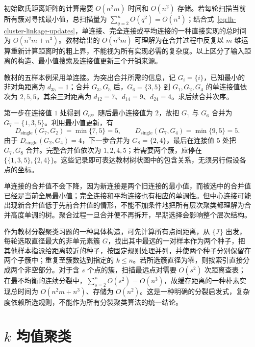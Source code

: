 初始欧氏距离矩阵的计算需要 $O(n^2m)$ 时间和 $O(n^2)$ 存储。若每轮扫描当前所有簇对寻找最小值，总扫描量为 $\sum_{q=2}^nO(q^2)=O(n^3)$；结合式~\eqref{eq:lh-cluster-linkage-updates}，单连接、完全连接或平均连接的一种直接实现的总时间为 $O(n^2m+n^3)$。教材给出的 $O(n^3m)$ 可理解为在合并过程中反复以 $m$ 维运算重新计算距离时的粗上界，不能视为所有实现必需的复杂度。以上区分了输入距离的构造、最小值搜索及连接值更新三个开销来源。

\begin{example}
\label{ex:lh-cluster-agglomerative-five}
教材的五样本例采用单连接。为突出合并所需的信息，记 $G_i=\{i\}$，已知最小的非对角距离为 $d_{35}=1$；合并 $G_3,G_5$ 后，$G_6=\{3,5\}$ 到 $G_1,G_2,G_4$ 的单连接值依次为 $2,5,5$，其余三对距离为 $d_{12}=7$、$d_{14}=9$、$d_{24}=4$。求后续合并次序。
\end{example}
\begin{solve}
第一步在连接值 $1$ 处得到 $G_6$。随后最小连接值为 $2$，故把 $G_1$ 与 $G_6$ 合并为 $G_7=\{1,3,5\}$。利用最小值更新，有
\[
D_{\mathrm{single}}(G_7,G_2)=\min\{7,5\}=5,\qquad
D_{\mathrm{single}}(G_7,G_4)=\min\{9,5\}=5.
\]
由于 $D_{\mathrm{single}}(G_2,G_4)=4$，下一步合并为 $G_8=\{2,4\}$，最后在连接值 $5$ 处把 $G_7,G_8$ 合并。完整合并值依次为 $1,2,4,5$；若需要两个簇，应停在 $\{\{1,3,5\},\{2,4\}\}$。这些记录即可表达教材树状图中的包含关系，无须另行假设各点的坐标。
\end{solve}

单连接的合并值不会下降，因为新连接是两个旧连接的最小值，而被选中的合并值已经是当前全局最小值；完全连接和平均连接也有相应的单调性。但中心连接可能出现新合并值低于先前合并值的情形，不能不加条件地把所有层次聚类都理解为合并高度单调的树。聚合过程一旦合并便不再拆开，早期选择会影响整个层次结构。

作为教材分裂聚类习题的一种具体构造，可先计算所有点间距离，从 $\{\mathcal I\}$ 出发，每轮选取直径最大的非单元素簇 $G$，找出其中最远的一对样本作为两个种子，把其他样本指派给距离较近的种子，按固定规则处理并列，并使两个种子分别保留在两个子簇中；重复至簇数达到指定的 $k\leq n$。若所选簇直径为零，则按索引直接分成两个非空部分。对于含 $s$ 个点的簇，扫描最远点对需要 $O(s^2)$ 次距离查表；在最不均衡的连续分裂中，$\sum_{s=2}^nO(s^2)=O(n^3)$，故缓存距离的一种朴素实现总时间为 $O(n^2m+n^3)$、存储为 $O(n^2)$。这是一种明确的分裂启发式，复杂度依赖所选规则，不能作为所有分裂聚类算法的统一结论。

\section{\texorpdfstring{$k$}{k} 均值聚类}
\label{sec:lh-kmeans}

